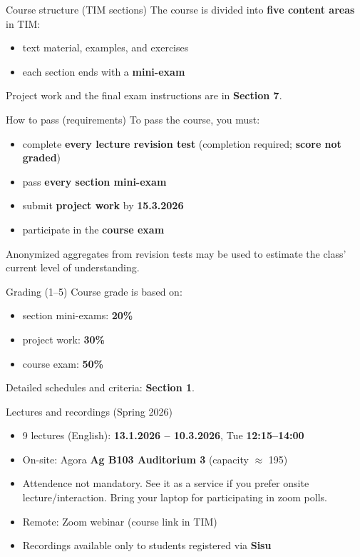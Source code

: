 \documentclass[10pt,aspectratio=169]{beamer}
\begin{document}
\begin{frame}{Course structure (TIM sections)}
The course is divided into \textbf{five content areas} in TIM:
\begin{itemize}
  \item text material, examples, and exercises
  \item each section ends with a \textbf{mini-exam}
\end{itemize}

\vspace{0.5em}
Project work and the final exam instructions are in \textbf{Section 7}.
\end{frame}

\begin{frame}{How to pass (requirements)}
To pass the course, you must:
\begin{itemize}
  \item complete \textbf{every lecture revision test} (completion required; \textbf{score not graded})
  \item pass \textbf{every section mini-exam}
  \item submit \textbf{project work} by \textbf{15.3.2026}
  \item participate in the \textbf{course exam}
\end{itemize}

\vspace{0.35em}
\tiny Anonymized aggregates from revision tests may be used to estimate the class’ current level of understanding.
\end{frame}

\begin{frame}{Grading (1--5)}
Course grade is based on:
\begin{itemize}
  \item section mini-exams: \textbf{20\%}
  \item project work: \textbf{30\%}
  \item course exam: \textbf{50\%}
\end{itemize}

\vspace{0.5em}
Detailed schedules and criteria: \textbf{Section 1}.
\end{frame}

\begin{frame}{Lectures and recordings (Spring 2026)}
\begin{itemize}
  \item 9 lectures (English): \textbf{13.1.2026 -- 10.3.2026}, Tue \textbf{12:15--14:00}
  \item On-site: Agora \textbf{Ag B103 Auditorium 3} (capacity \(\approx\) 195)
  \item Attendence not mandatory. See it as a service if you prefer onsite lecture/interaction. Bring your laptop for participating in zoom polls.
  \item Remote: Zoom webinar (course link in TIM)
  \item Recordings available only to students registered via \textbf{Sisu}
\end{itemize}
\end{frame}
\end{document}
